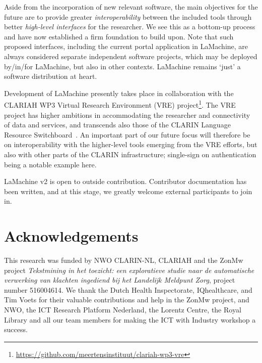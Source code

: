 \documentclass[a4paper,11pt]{article}
\begin{document}
Aside from the incorporation of new relevant software, the main objectives for the future are to provide
greater \emph{interoperability} between the included tools through better \emph{high-level interfaces} for the
researcher. We see this as a bottom-up process and have now established a firm foundation to build upon. Note that such
proposed interfaces, including the current portal application in LaMachine, are always considered separate independent
software projects, which may be deployed by/in/for LaMachine, but also in other contexts. LaMachine remains `just'
a software distribution at heart.

Development of LaMachine presently takes place in collaboration with the CLARIAH WP3 Virtual Research Environment (VRE)
project\footnote{\url{https://github.com/meertensinstituut/clariah-wp3-vre}}. The VRE project has higher ambitions in
accommodating the researcher and connectivity of data and services, and transcends also those of the CLARIN Language
Resource Switchboard~\cite{switchboard}. An important part of our future focus will therefore be on interoperability
with the higher-level tools emerging from the VRE efforts, but also with other parts of the CLARIN infrastructure;
single-sign on authentication being a notable example here.

LaMachine v2 is open to  outside contribution. Contributor documentation has been written, and at this stage, we greatly
welcome external participants to join in.

\section*{Acknowledgements}

This research was funded by NWO CLARIN-NL, CLARIAH and the ZonMw project {\it Tekstmining in het toezicht: een exploratieve studie naar de automatische verwerking van klachten ingediend bij het Landelijk Meldpunt Zorg}, project number 516004614. We thank the Dutch Health Inspectorate, IQhealthcare, and Tim Voets for their valuable contributions and help in the ZonMw project, and NWO, the ICT Research Platform Nederland, the Lorentz Centre, the Royal Library and all our team members for making the ICT with Industry workshop a success.



\end{document}
